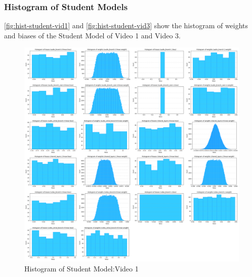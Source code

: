 \documentclass{ioereport}
\begin{document}
    \pagebreak

    \subsubsection{Histogram of Student Models}
    \autoref{fig:hist-student-vid1} and \autoref{fig:hist-student-vid3} show the histogram of weights and biases of the Student Model of Video 1 and Video 3.

    \begin{figure}[H]
        \centering
        \includegraphics[width=\linewidth]{assets/quantization/histogram/histogram_vvsa_student.png}
        \caption{Histogram of Student Model:Video 1}
        \label{fig:hist-student-vid1}
    \end{figure}
\end{document}

